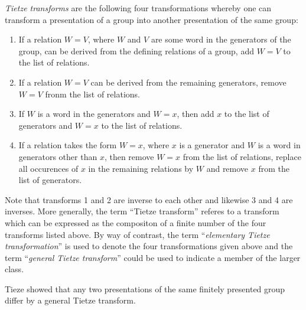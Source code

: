 \documentclass[12pt]{article}
\begin{document}
\emph{Tietze transforms} are the following four transformations whereby one
can transform a presentation of a group into another presentation of
the same group:

\begin{enumerate}
\item If a relation $W=V$, where $W$ and $V$ are some word in the
generators of the group, can be derived from the defining relations of
a group, add $W=V$ to the list of relations.
\item If a relation $W=V$ can be derived from the remaining
generators, remove $W=V$ fronm the list of relations.
\item If $W$ is a word in the generators and $W=x$, then add $x$ to
the list of generators and $W=x$ to the list of relations.
\item If a relation takes the form $W=x$, where $x$ is a generator and
$W$ is a word in generators other than $x$, then remove $W=x$ from the
list of relations, replace all occurences of $x$ in the remaining
relations by $W$ and remove $x$ from the list of generators.
\end{enumerate}

Note that transforms 1 and 2 are inverse to each other and likewise 3
and 4 are inverses.  More generally, the term ``Tietze transform''
referes to a transform which can be expressed as the compositon of a
finite number of the four transforms listed above.  By way of
contrast, the term ``\emph{elementary Tietze transformation}'' is used
to denote the four transformations given above and the term
``\emph{general Tietze transform}'' could be used to indicate a member
of the larger class.

Tieze showed that any two presentations of the same finitely presented
group differ by a general Tietze transform.
\end{document}
